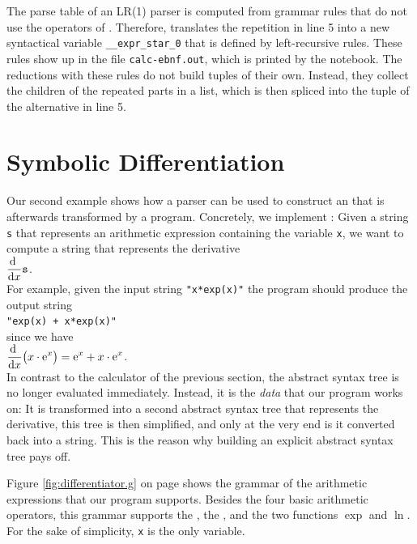 \remarkEng
The parse table of an LR(1) parser is computed from grammar rules that do not use the operators of
.  Therefore,  translates the repetition in line 5 into a new syntactical
variable \texttt{\_\_expr\_star\_0} that is defined by left-recursive rules.  These rules show up in the file
\texttt{calc-ebnf.out}, which is printed by the notebook.  The reductions with these rules do not build tuples
of their own.  Instead, they collect the children of the repeated parts in a list, which is then spliced into
the tuple of the alternative in line 5.  \eox

\section{Symbolic Differentiation  \label{section:differentiator}}
Our second example shows how a parser can be used to construct an  that is
afterwards transformed by a program.  Concretely, we implement :  Given a
string \texttt{s} that represents an arithmetic expression containing the variable \texttt{x}, we want to
compute a string that represents the derivative
\\[0.2cm]
\hspace*{1.3cm}
$\displaystyle\frac{\mathrm{d}\;}{\mathrm{d}x} \texttt{s}$.
\\[0.2cm]
For example, given the input string \texttt{"x*exp(x)"} the program should produce the output string
\\[0.2cm]
\hspace*{1.3cm}
\texttt{"exp(x) + x*exp(x)"}
\\[0.2cm]
since we have
\\[0.2cm]
\hspace*{1.3cm}
$\displaystyle\frac{\mathrm{d}\;}{\mathrm{d}x} \bigl( x \cdot \mathrm{e}^x \bigr) = \mathrm{e}^x + x \cdot \mathrm{e}^x$.
\\[0.2cm]
In contrast to the calculator of the previous section, the abstract syntax tree is no longer evaluated
immediately.  Instead, it is the \emph{data} that our program works on:  It is transformed into a second
abstract syntax tree that represents the derivative, this tree is then simplified, and only at the very
end is it converted back into a string.  This is the reason why building an explicit abstract syntax tree
pays off.

Figure \ref{fig:differentiator.g} on page \pageref{fig:differentiator.g} shows the grammar of the
arithmetic expressions that our program supports.  Besides the four basic arithmetic operators, this
grammar supports the  \squoted{**}, the , and the two
functions $\exp$ and $\ln$.  For the sake of simplicity, \texttt{x} is the only variable.

